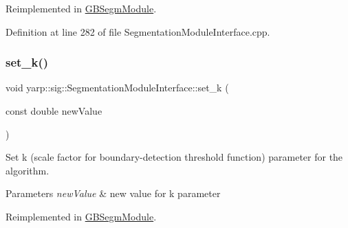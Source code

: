 Reimplemented in \mbox{\hyperlink{classGBSegmModule_ae32ae1b1461e19c3a1b2f429c729ed03}{G\+B\+Segm\+Module}}.



Definition at line 282 of file Segmentation\+Module\+Interface.\+cpp.


\begin{DoxyCode}{0}

\end{DoxyCode}
\mbox{\label{classyarp_1_1sig_1_1SegmentationModuleInterface_a2851eae0226ad68f41cd8b61d8bb1456}} 
\subsubsection{\texorpdfstring{set\_k()}{set\_k()}}
{\footnotesize\ttfamily void yarp\+::sig\+::\+Segmentation\+Module\+Interface\+::set\+\_\+k (\begin{DoxyParamCaption}\item[{const double}]{new\+Value }\end{DoxyParamCaption})\hspace{0.3cm}{\ttfamily [virtual]}}



Set k (scale factor for boundary-\/detection threshold function) parameter for the algorithm. 


\begin{DoxyParams}{Parameters}
{\em new\+Value} & new value for k parameter \\
\hline
\end{DoxyParams}


Reimplemented in \mbox{\hyperlink{classGBSegmModule_a15129913273e221a46c428f697e40575}{G\+B\+Segm\+Module}}.



